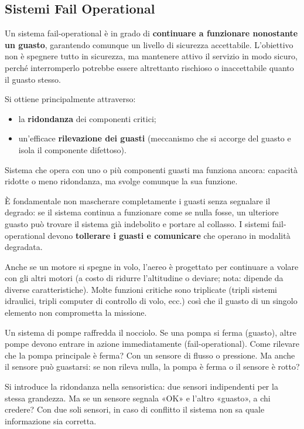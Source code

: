 \subsection{Sistemi Fail Operational}
\begin{defn}
Un sistema fail-operational è in grado di \textbf{continuare a funzionare nonostante un guasto}, garantendo comunque un livello di sicurezza accettabile. L'obiettivo non è spegnere tutto in sicurezza, ma mantenere attivo il servizio in modo sicuro, perché interromperlo potrebbe essere altrettanto rischioso o inaccettabile quanto il guasto stesso.
\end{defn}
Si ottiene principalmente attraverso:
\begin{itemize}
    \item la \textbf{ridondanza} dei componenti critici;
    \item un'efficace \textbf{rilevazione dei guasti} (meccanismo che si accorge del guasto e isola il componente difettoso).
\end{itemize}

\begin{defn}
Sistema che opera con uno o più componenti guasti ma funziona ancora: capacità ridotte o meno ridondanza, ma svolge comunque la sua funzione.
\end{defn}
È fondamentale non mascherare completamente i guasti senza segnalare il degrado: se il sistema continua a funzionare come se nulla fosse, un ulteriore guasto può trovare il sistema già indebolito e portare al collasso. I sistemi fail-operational devono \textbf{tollerare i guasti e comunicare} che operano in modalità degradata.

\begin{ex}
Anche se un motore si spegne in volo, l'aereo è progettato per continuare a volare con gli altri motori (a costo di ridurre l'altitudine o deviare; nota: dipende da diverse caratteristiche). Molte funzioni critiche sono triplicate (tripli sistemi idraulici, tripli computer di controllo di volo, ecc.) così che il guasto di un singolo elemento non comprometta la missione.
\end{ex}

\begin{ex}
Un sistema di pompe raffredda il nocciolo. Se una pompa si ferma (guasto), altre pompe devono entrare in azione immediatamente (fail-operational). Come rilevare che la pompa principale è ferma? Con un sensore di flusso o pressione. Ma anche il sensore può guastarsi: se non rileva nulla, la pompa è ferma o il sensore è rotto?

Si introduce la ridondanza nella sensoristica: due sensori indipendenti per la stessa grandezza. Ma se un sensore segnala «OK» e l'altro «guasto», a chi credere? Con due soli sensori, in caso di conflitto il sistema non sa quale informazione sia corretta.
\end{ex}

